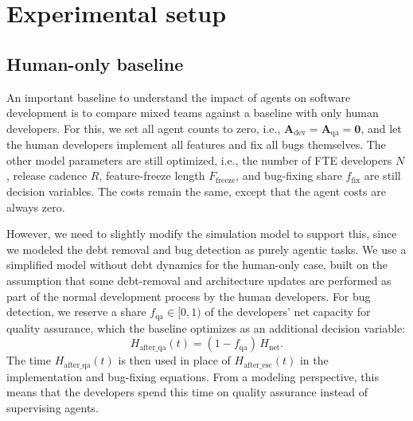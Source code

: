 \documentclass[smallextended]{svjour3}       %
\begin{document}
\section{Experimental setup}
\label{sec:setup}

\subsection{Human-only baseline}
\label{sec:setup:baseline}

An important baseline to understand the impact of agents on software development is to compare mixed teams against a baseline with only human developers. For this, we set all agent counts to zero, i.e., $\mathbf{A}_\mathrm{dev} = \mathbf{A}_\mathrm{qa} = \mathbf{0}$, and let the human developers implement all features and fix all bugs themselves. The other model parameters are still optimized, i.e., the number of FTE developers $N$, release cadence $R$, feature-freeze length $F_\mathrm{freeze}$, and bug-fixing share $f_\mathrm{fix}$ are still decision variables. The costs remain the same, except that the agent costs are always zero. 

However, we need to slightly modify the simulation model to support this, since we modeled the debt removal and bug detection as purely agentic tasks. We use a simplified model without debt dynamics for the human-only case, built on the assumption that some debt-removal and architecture updates are performed as part of the normal development process by the human developers. For bug detection, we reserve a share $f_\mathrm{qa} \in [0,1)$ of the developers' net capacity for quality assurance, which the baseline optimizes as an additional decision variable:
\begin{equation}
  H_\mathrm{after\_qa}(t) = (1 - f_\mathrm{qa})\,H_\mathrm{net}.
  \label{eq:hafter_qa}
\end{equation}
The time $H_\mathrm{after\_qa}(t)$ is then used in place of $H_\mathrm{after\_esc}(t)$ in the implementation and bug-fixing equations. From a modeling perspective, this means that the developers spend this time on quality assurance instead of supervising agents.
\end{document}
